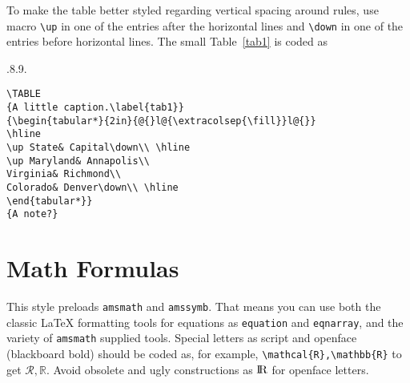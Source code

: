 \documentclass{ics-2015}
\begin{document}
To make the table better styled regarding vertical spacing around rules,
use macro \verb+\up+ in one of the entries after the horizontal lines
and \verb+\down+ in one of the entries before horizontal lines. The small Table~\ref{tab1}
is coded as

{\fs.8.9.\relax
\begin{verbatim}
\TABLE
{A little caption.\label{tab1}}
{\begin{tabular*}{2in}{@{}l@{\extracolsep{\fill}}l@{}}
\hline
\up State& Capital\down\\ \hline
\up Maryland& Annapolis\\
Virginia& Richmond\\
Colorado& Denver\down\\ \hline
\end{tabular*}}
{A note?}
\end{verbatim}}


\section{Math Formulas}

This style preloads \verb+amsmath+ and \verb+amssymb+. That means you
can use both the classic LaTeX formatting tools for equations as
\verb+equation+ and \verb+eqnarray+, and the variety of \verb+amsmath+ supplied tools.
Special letters as script and openface (blackboard bold) should be coded as, for example,
\verb+\mathcal{R},\mathbb{R}+ to get $\mathcal{R}, \mathbb{R}$. Avoid obsolete and ugly constructions as
$\textrm{I{\kern-0.17em}R}$ for openface letters.
\end{document}
